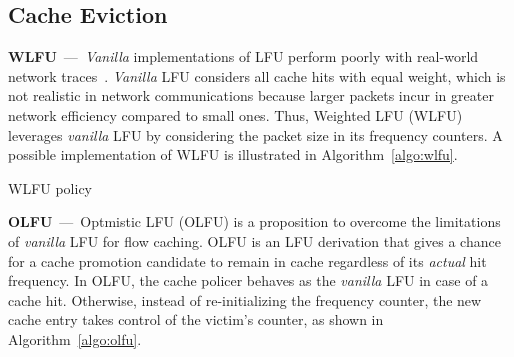 \subsection{Cache Eviction}

\textbf{WLFU}~---~\textit{Vanilla} implementations of LFU perform poorly with real-world network traces~\cite{Kim:09}.
\textit{Vanilla} LFU considers all cache hits with equal weight, which is not realistic in network communications because larger packets incur in greater network efficiency compared to small ones.
Thus, Weighted LFU (WLFU) leverages \textit{vanilla} LFU by considering the packet size in its frequency counters.
A possible implementation of WLFU is illustrated in Algorithm~\ref{algo:wlfu}.

\begin{algorithm}[]
\caption{WLFU policy}
\label{algo:wlfu}
\SetInd{0.1em}{.9em}
\SetAlgoLined
\footnotesize
{}
%
%
%
%
%
\end{algorithm}

\textbf{OLFU}~---~Optmistic LFU (OLFU) is a proposition to overcome the limitations of \textit{vanilla} LFU for flow caching.
OLFU is an LFU derivation that gives a chance for a cache promotion candidate to remain in cache regardless of its \textit{actual} hit frequency.
In OLFU, the cache policer behaves as the \textit{vanilla} LFU in case of a cache hit.
Otherwise, instead of re-initializing the frequency counter, the new cache entry takes control of the victim's counter, as shown in Algorithm~\ref{algo:olfu}.

